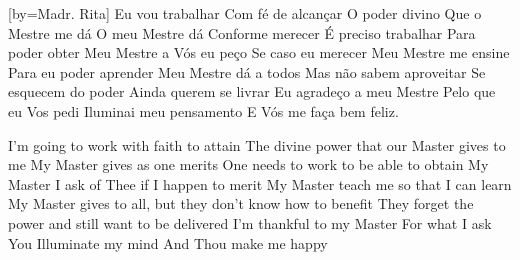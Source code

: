 [by={Madr. Rita}]
  \beginchorus
    Eu vou trabalhar
    Com fé de alcançar
  \endchorus\glueverses\beginchorus
    O poder divino
    Que o Mestre me dá
  \endchorus
  \beginchorus
    O meu Mestre dá
    Conforme merecer
  \endchorus\glueverses\beginchorus
    É preciso trabalhar
    Para poder obter
  \endchorus
  \beginchorus
    Meu Mestre a Vós eu peço
    Se caso eu merecer
  \endchorus\glueverses\beginchorus
    Meu Mestre me ensine
    Para eu poder aprender
  \endchorus
  \beginchorus
    Meu Mestre dá a todos
    Mas não sabem aproveitar
  \endchorus\glueverses\beginchorus
    Se esquecem do poder
    Ainda querem se livrar
  \endchorus
  \beginchorus
    Eu agradeço a meu Mestre
    Pelo que eu Vos pedi
  \endchorus\glueverses\beginchorus
    Iluminai meu pensamento
    E Vós me faça bem feliz.
  \endchorus
  \begin{translation}[EN]
    I'm going to work with faith to attain
    The divine power that our Master gives to me
    \nextverse
    My Master gives as one merits
    One needs to work to be able to obtain
    \nextverse
    My Master I ask of Thee if I happen to merit
    My Master teach me so that I can learn
    \nextverse
    My Master gives to all, but they don’t know how to benefit
    They forget the power and still want to be delivered
    \nextverse
    I’m thankful to my Master For what I ask
    You Illuminate my mind And Thou make me happy
  \end{translation}
\endsong


